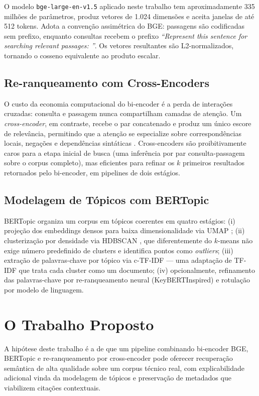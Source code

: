 \documentclass[11pt,a4paper]{article}
\begin{document}
O modelo \texttt{bge-large-en-v1.5} \cite{xiao2024} aplicado neste trabalho tem aproximadamente 335 milhões de parâmetros, produz vetores de 1.024 dimensões e aceita janelas de até 512 tokens. Adota a convenção assimétrica do BGE: passagens são codificadas sem prefixo, enquanto consultas recebem o prefixo \textit{``Represent this sentence for searching relevant passages: ''}. Os vetores resultantes são L2-normalizados, tornando o cosseno equivalente ao produto escalar.

\subsection{Re-ranqueamento com Cross-Encoders}

O custo da economia computacional do bi-encoder é a perda de interações cruzadas: consulta e passagem nunca compartilham camadas de atenção. Um \textit{cross-encoder}, em contraste, recebe o par concatenado e produz um único escore de relevância, permitindo que a atenção se especialize sobre correspondências locais, negações e dependências sintáticas \cite{nogueira2019}. Cross-encoders são proibitivamente caros para a etapa inicial de busca (uma inferência por par consulta-passagem sobre o corpus completo), mas eficientes para refinar os $k$ primeiros resultados retornados pelo bi-encoder, em pipelines de dois estágios.

\subsection{Modelagem de Tópicos com BERTopic}

BERTopic \cite{grootendorst2022} organiza um corpus em tópicos coerentes em quatro estágios: (i) projeção dos embeddings densos para baixa dimensionalidade via UMAP \cite{mcinnes2018}; (ii) clusterização por densidade via HDBSCAN \cite{mcinnes2017}, que diferentemente do $k$-means não exige número predefinido de clusters e identifica pontos como \textit{outliers}; (iii) extração de palavras-chave por tópico via c-TF-IDF --- uma adaptação de TF-IDF que trata cada cluster como um documento; (iv) opcionalmente, refinamento das palavras-chave por re-ranqueamento neural (KeyBERTInspired) e rotulação por modelo de linguagem.

\section{O Trabalho Proposto}

A hipótese deste trabalho é a de que um pipeline combinando bi-encoder BGE, BERTopic e re-ranqueamento por cross-encoder pode oferecer recuperação semântica de alta qualidade sobre um corpus técnico real, com explicabilidade adicional vinda da modelagem de tópicos e preservação de metadados que viabilizem citações contextuais.
\end{document}
